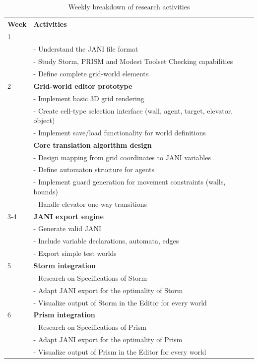\documentclass{report}
\begin{document}
\begin{table}[h]
\centering
\caption{Weekly breakdown of research activities}
\label{tab:schedule}
\begin{tabular}{|p{1.5cm}|p{11cm}|}
\hline
\textbf{Week} & \textbf{Activities} \\ \hline
1 & \textbf{Literature \and requirements gathering} \\
    & - Understand the JANI file format \\
    & - Study Storm, PRISM and Modest Toolset Checking capabilities \\
    & - Define complete grid-world elements 
    \\ \hline
2 & \textbf{Grid-world editor prototype} \\
    & - Implement basic 3D grid rendering \\
    & - Create cell-type selection interface (wall, agent, target, elevator, object) \\
    & - Implement save/load functionality for world definitions \\
    & \textbf{Core translation algorithm design} \\
    & - Design mapping from grid coordinates to JANI variables \\
    & - Define automaton structure for agents\\
    & - Implement guard generation for movement constraints (walls, bounds) \\
    & - Handle elevator one-way transitions \\
    \hline
3-4 & \textbf{JANI export engine} \\
    & - Generate valid JANI \\
    & - Include variable declarations, automata, edges \\
    & - Export simple test worlds \\ \hline
5 & \textbf{Storm integration} \\
    & - Research on Specifications of Storm \\
    & - Adapt JANI export for the optimality of Storm \\
    & - Visualize output of Storm in the Editor for every world \\ \hline
6 & \textbf{Prism integration} \\
    & - Research on Specifications of Prism \\
    & - Adapt JANI export for the optimality of Prism \\
    & - Visualize output of Prism in the Editor for every world \\ \hline

\end{tabular}
\end{table}
\end{document}

